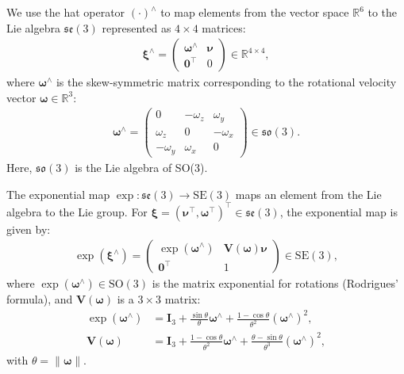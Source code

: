 We use the hat operator $(\cdot)^{\wedge}$ to map elements from the vector space ${\mathbb{R}}^6$ to the Lie algebra ${\mathfrak{se}}(3)$ represented as $4 \times 4$ matrices:
\begin{equation}
\begin{aligned}
\boldsymbol{\xi}^{\wedge} =
\begin{pmatrix}
\boldsymbol{\omega}^{\wedge} & \boldsymbol{\nu} \\
{\mathbf{0}}^{\top} & 0
\end{pmatrix} \in {\mathbb{R}}^{4\times4},
\label{eq:se3_hat_operator}
\end{aligned}
\end{equation}
where $\boldsymbol{\omega}^{\wedge}$ is the skew-symmetric matrix corresponding to the rotational velocity vector $\boldsymbol{\omega} \in {\mathbb{R}}^3$:
\begin{equation}
\begin{aligned}
\boldsymbol{\omega}^{\wedge} =
\begin{pmatrix}
0 & -\omega_z & \omega_y \\
\omega_z & 0 & -\omega_x \\
-\omega_y & \omega_x & 0
\end{pmatrix} \in {\mathfrak{so}}(3).
\label{eq:so3_hat_operator}
\end{aligned}
\end{equation}
Here, ${\mathfrak{so}}(3)$ is the Lie algebra of SO(3).

The exponential map $\exp: {\mathfrak{se}}(3) \to \text{SE}(3)$ maps an element from the Lie algebra to the Lie group. For $\boldsymbol{\xi} = (\boldsymbol{\nu}^{\top}, \boldsymbol{\omega}^{\top})^{\top} \in {\mathfrak{se}}(3)$, the exponential map is given by:
\begin{equation}
\begin{aligned}
\exp(\boldsymbol{\xi}^{\wedge}) =
\begin{pmatrix}
\exp(\boldsymbol{\omega}^{\wedge}) & {\mathbf{V}}(\boldsymbol{\omega}) \boldsymbol{\nu} \\
{\mathbf{0}}^{\top} & 1
\end{pmatrix} \in \text{SE}(3),
\label{eq:se3_exp_map}
\end{aligned}
\end{equation}
where $\exp(\boldsymbol{\omega}^{\wedge}) \in \text{SO}(3)$ is the matrix exponential for rotations (Rodrigues' formula), and ${\mathbf{V}}(\boldsymbol{\omega})$ is a $3 \times 3$ matrix:
\begin{equation}
\begin{aligned}
\exp(\boldsymbol{\omega}^{\wedge}) &= {\mathbf{I}}_3 + \frac{\sin \theta}{\theta } \boldsymbol{\omega}^{\wedge} + \frac{1-\cos \theta }{\theta^2}(\boldsymbol{\omega}^{\wedge})^2, \\
{\mathbf{V}}(\boldsymbol{\omega}) &= {\mathbf{I}}_3 + \frac{1-\cos\theta}{\theta^2}\boldsymbol{\omega}^{\wedge} + \frac{\theta-\sin \theta}{\theta^3}(\boldsymbol{\omega}^{\wedge})^2,
\label{eq:so3_exp_and_V}
\end{aligned}
\end{equation}
with $\theta = \|\boldsymbol{\omega}\|$.

